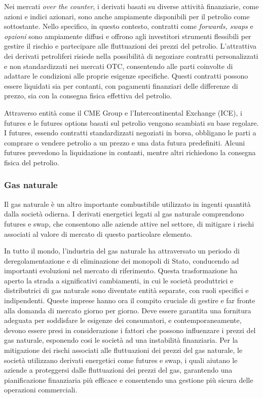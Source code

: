 \documentclass[12pt,a4paper]{report}
\begin{document}
Nei mercati \textit{over the counter}, i derivati basati su diverse attività finanziarie, come azioni e indici azionari, sono anche ampiamente disponibili per il petrolio come sottostante. Nello specifico, in questo contesto, contratti come \textit{forwards, swaps} e \textit{opzioni} sono ampiamente diffusi e offrono agli investitori strumenti flessibili per gestire il rischio e partecipare alle fluttuazioni dei prezzi del petrolio.
L'attrattiva dei derivati petroliferi risiede nella possibilità di negoziare contratti personalizzati e non standardizzati nei mercati OTC, consentendo alle parti coinvolte di adattare le condizioni alle proprie esigenze specifiche. Questi contratti possono essere liquidati sia per contanti, con pagamenti finanziari delle differenze di prezzo, sia con la consegna fisica effettiva del petrolio.

Attraverso entità come il CME Group e l'Intercontinental Exchange (ICE), i futures e le futures options basati sul petrolio vengono scambiati su base regolare. I futures, essendo contratti standardizzati negoziati in borsa, obbligano le parti a comprare o vendere petrolio a un prezzo e una data futura predefiniti. Alcuni futures prevedono la liquidazione in contanti, mentre altri richiedono la consegna fisica del petrolio.

\subsubsection{Gas naturale}

Il gas naturale è un altro importante combustibile utilizzato in ingenti quantità dalla società odierna. I derivati energetici legati al gas naturale comprendono futures e swap, che consentono alle aziende attive nel settore, di mitigare i rischi associati al valore di mercato di questo particolare elemento. 

In tutto il mondo, l'industria del gas naturale ha attraversato un periodo di deregolamentazione e di eliminazione dei monopoli di Stato, conducendo ad importanti evoluzioni nel mercato di riferimento. Questa trasformazione ha aperto la strada a significativi cambiamenti, in cui le società produttrici e distributrici di gas naturale sono diventate entità separate, con ruoli specifici e indipendenti. Queste imprese hanno ora il compito cruciale di gestire e far fronte alla domanda di mercato giorno per giorno. Deve essere garantita una fornitura adeguata per soddisfare le esigenze dei consumatori, e contemporaneamente, devono essere presi in considerazione i fattori che possono influenzare i prezzi del gas naturale, esponendo cosi le società ad una instabilità finanziaria.
Per la mitigazione dei rischi associati alle fluttuazioni dei prezzi del gas naturale, le società utilizzano derivati energetici come futures e swap, i quali aiutano le aziende a proteggersi dalle fluttuazioni dei prezzi del gas, garantendo una pianificazione finanziaria più efficace e consentendo una gestione più sicura delle operazioni commerciali.
\end{document}
